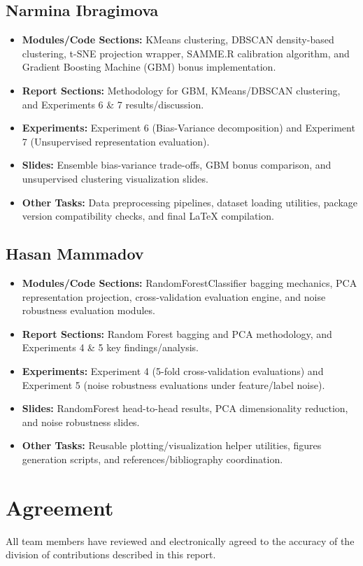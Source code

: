 \documentclass[11pt,a4paper]{article}
\begin{document}
\subsection{Narmina Ibragimova}
\begin{itemize}
    \item \textbf{Modules/Code Sections:} KMeans clustering, DBSCAN density-based clustering, t-SNE projection wrapper, SAMME.R calibration algorithm, and Gradient Boosting Machine (GBM) bonus implementation.
    \item \textbf{Report Sections:} Methodology for GBM, KMeans/DBSCAN clustering, and Experiments 6 \& 7 results/discussion.
    \item \textbf{Experiments:} Experiment 6 (Bias-Variance decomposition) and Experiment 7 (Unsupervised representation evaluation).
    \item \textbf{Slides:} Ensemble bias-variance trade-offs, GBM bonus comparison, and unsupervised clustering visualization slides.
    \item \textbf{Other Tasks:} Data preprocessing pipelines, dataset loading utilities, package version compatibility checks, and final LaTeX compilation.
\end{itemize}

\subsection{Hasan Mammadov}
\begin{itemize}
    \item \textbf{Modules/Code Sections:} RandomForestClassifier bagging mechanics, PCA representation projection, cross-validation evaluation engine, and noise robustness evaluation modules.
    \item \textbf{Report Sections:} Random Forest bagging and PCA methodology, and Experiments 4 \& 5 key findings/analysis.
    \item \textbf{Experiments:} Experiment 4 (5-fold cross-validation evaluations) and Experiment 5 (noise robustness evaluations under feature/label noise).
    \item \textbf{Slides:} RandomForest head-to-head results, PCA dimensionality reduction, and noise robustness slides.
    \item \textbf{Other Tasks:} Reusable plotting/visualization helper utilities, figures generation scripts, and references/bibliography coordination.
\end{itemize}

\section{Agreement}
All team members have reviewed and electronically agreed to the accuracy of the division of contributions described in this report.
\end{document}
